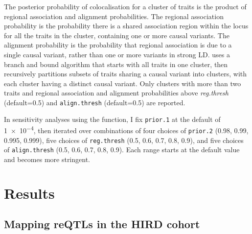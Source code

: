 The posterior probability of colocalisation for a cluster of traits is the product of regional association and alignment probabilities.
The regional association probability is the probability there is a shared association region within the locus for all the traits in the cluster, containing one or more causal variants.
The alignment probability is the probability that regional association is due to a single causal variant, rather than one or more variants in strong \gls{LD}. 
 uses a branch and bound algorithm that starts with all traits in one cluster,
then recursively partitions subsets of traits sharing a causal variant into clusters, with each cluster having a distinct causal variant.
Only clusters with more than two traits and regional association and alignment probabilities above \textit{reg.thresh} (default=0.5) and \texttt{align.thresh} (default=0.5) are reported.

In sensitivity analyses using the  function,
I fix \texttt{prior.1} at the default of \num{1e-4}, 
then iterated over combinations of
four choices of \texttt{prior.2} (0.98, 0.99, 0.995, 0.999),
five choices of \texttt{reg.thresh} (0.5, 0.6, 0.7, 0.8, 0.9),
and five choices of \texttt{align.thresh} (0.5, 0.6, 0.7, 0.8, 0.9).
Each range starts at the default value and becomes more stringent.

\section{Results}

\subsection{Mapping reQTLs in the HIRD cohort}

